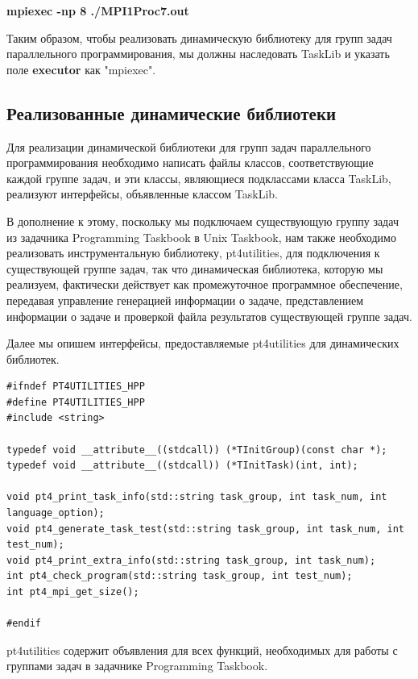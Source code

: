 \centerline{\textbf{mpiexec -np 8 ./MPI1Proc7.out}} 

Таким образом, чтобы реализовать динамическую библиотеку для групп задач параллельного 
программирования, мы должны наследовать TaskLib и указать поле \textbf{executor} как "mpiexec".

\subsection{Реализованные динамические библиотеки}

Для реализации динамической библиотеки для групп задач параллельного программирования
 необходимо написать файлы классов, соответствующие каждой группе задач, и эти 
 классы, являющиеся подклассами класса TaskLib, реализуют интерфейсы, объявленные классом TaskLib.

 В дополнение к этому, поскольку мы подключаем существующую группу задач из задачника Programming Taskbook 
 в Unix Taskbook, нам также необходимо реализовать инструментальную 
 библиотеку, pt4utilities, для подключения к существующей группе задач, так что динамическая 
 библиотека, которую мы реализуем, фактически действует как промежуточное программное обеспечение, 
 передавая управление генерацией информации о задаче, представлением информации о задаче и 
 проверкой файла результатов существующей группе задач.

 Далее мы опишем интерфейсы, предоставляемые pt4utilities для динамических библиотек.

\lstset{language=c++}
\begin{lstlisting}
#ifndef PT4UTILITIES_HPP
#define PT4UTILITIES_HPP
#include <string>

typedef void __attribute__((stdcall)) (*TInitGroup)(const char *);
typedef void __attribute__((stdcall)) (*TInitTask)(int, int);

void pt4_print_task_info(std::string task_group, int task_num, int language_option);
void pt4_generate_task_test(std::string task_group, int task_num, int test_num);
void pt4_print_extra_info(std::string task_group, int task_num);
int pt4_check_program(std::string task_group, int test_num);
int pt4_mpi_get_size();

#endif
\end{lstlisting}

pt4utilities содержит объявления для всех функций, необходимых для работы с группами 
задач в задачнике Programming Taskbook.

